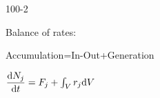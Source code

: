 \begin{mitframe}{100-2}
\begin{listone}
		\item Balance of rates:
        \item Accumulation=In-Out+Generation
        \item $\dfrac{\mathrm{d}\massspecflux{j}}{\mathrm{d}\timet}=\force_j+\int_{\vol}\pos_j\mathrm{d}\vol$
\end{listone}
\end{mitframe}